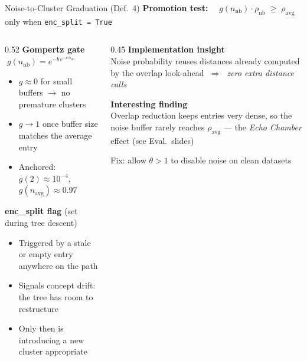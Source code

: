 \documentclass[aspectratio=169]{beamer}
\begin{document}
\begin{frame}{Noise-to-Cluster Graduation (Def.\ 4)}
\textbf{Promotion test:}
$\quad g(n_\text{nb})\cdot\rho_\text{nb} \;\geq\; \rho_\text{avg}$
\quad only when \texttt{enc\_split = True}

\vspace{0.25cm}
\begin{columns}[T]
  \begin{column}{0.52\textwidth}
    \textbf{Gompertz gate} $\;g(n_\text{nb}) = e^{-b\,e^{-c\,n_\text{nb}}}$
    \begin{itemize}
      \item $g \approx 0$ for small buffers $\to$ no premature clusters
      \item $g \to 1$ once buffer size matches the average entry
      \item Anchored: $g(2)\approx 10^{-4}$,\ $g(n_\text{avg})\approx 0.97$
    \end{itemize}
    \vspace{0.2cm}
    \textbf{enc\_split flag} (set during tree descent)
    \begin{itemize}
      \item Triggered by a stale or empty entry anywhere on the path
      \item Signals concept drift: the tree has room to restructure
      \item Only then is introducing a new cluster appropriate
    \end{itemize}
  \end{column}
  \begin{column}{0.45\textwidth}
    \textbf{Implementation insight}\\[0.15cm]
    Noise probability reuses distances already computed by the overlap look-ahead
    $\;\Rightarrow\;$ \emph{zero extra distance calls}

    \vspace{0.35cm}
    \textbf{Interesting finding}\\[0.15cm]
    Overlap reduction keeps entries very dense, so the noise buffer rarely reaches $\rho_\text{avg}$
    --- the \emph{Echo Chamber} effect (see Eval.\ slides)

    \vspace{0.2cm}
    Fix: allow $\theta > 1$ to disable noise on clean datasets
  \end{column}
\end{columns}
\end{frame}
\end{document}
